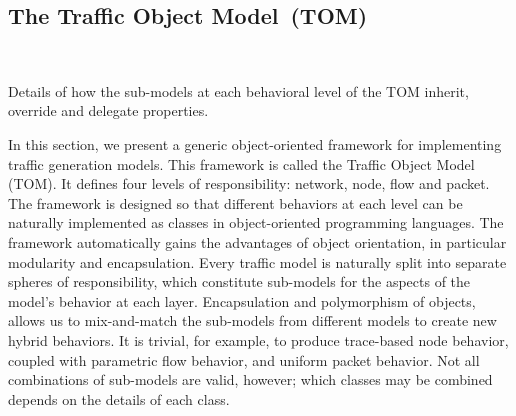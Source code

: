 \documentclass[conference]{IEEEtran}
\newcommand{\caps}[1]{{\small{#1}}}
\begin{document}
\subsection{The Traffic Object Model~(\caps{TOM})}\label{sec:tom}

\begin{table}[t]
\begin{center}
\small

\footnotesize\\[0.5em]
\end{center}
\vspace{-0.75em}
\caption{Details of how the sub-models at each behavioral level of the {\footnotesize{TOM}} inherit, override and delegate properties.}
\label{tab:models}
\vspace{-1em}
\end{table}

In this section, we present a generic object-oriented framework for implementing traffic generation models. This framework is called the Traffic Object Model (\caps{TOM}). It defines four levels of responsibility: network, node, flow and packet. The framework is designed so that different behaviors at each level can be naturally implemented  as classes in object-oriented programming languages. The framework automatically gains the advantages of object orientation, in particular modularity and encapsulation. Every traffic model is naturally split into separate spheres of responsibility, which constitute sub-models for the aspects of the model's behavior at each layer. Encapsulation and polymorphism of objects, allows us to mix-and-match the sub-models from different models to create new hybrid behaviors. It is trivial, for example, to produce trace-based node behavior, coupled with parametric flow behavior, and uniform packet behavior. Not all combinations of sub-models are valid, however; which classes may be combined depends on the details of each class.

\end{document}
